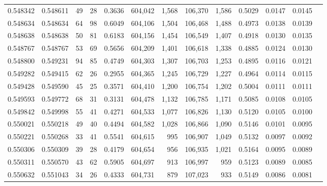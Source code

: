 \begin{tabular}{rrrrrrrrrrrrr}
0.548342 & 0.548611 &    49 &    28 &                                     0.3636 & 604,042 &   1,568 & 106,370 &   1,586 & 0.5029 & 0.0147 & 0.0145 \\
0.548634 & 0.548634 &    64 &    98 &                                     0.6049 & 604,106 &   1,504 & 106,468 &   1,488 & 0.4973 & 0.0138 & 0.0139 \\
0.548638 & 0.548638 &    50 &    81 &                                     0.6183 & 604,156 &   1,454 & 106,549 &   1,407 & 0.4918 & 0.0130 & 0.0135 \\
0.548767 & 0.548767 &    53 &    69 &                                     0.5656 & 604,209 &   1,401 & 106,618 &   1,338 & 0.4885 & 0.0124 & 0.0130 \\
0.548800 & 0.549231 &    94 &    85 &                                     0.4749 & 604,303 &   1,307 & 106,703 &   1,253 & 0.4895 & 0.0116 & 0.0121 \\
0.549282 & 0.549415 &    62 &    26 &                                     0.2955 & 604,365 &   1,245 & 106,729 &   1,227 & 0.4964 & 0.0114 & 0.0115 \\
0.549428 & 0.549590 &    45 &    25 &                                     0.3571 & 604,410 &   1,200 & 106,754 &   1,202 & 0.5004 & 0.0111 & 0.0111 \\
0.549593 & 0.549772 &    68 &    31 &                                     0.3131 & 604,478 &   1,132 & 106,785 &   1,171 & 0.5085 & 0.0108 & 0.0105 \\
0.549842 & 0.549998 &    55 &    41 &                                     0.4271 & 604,533 &   1,077 & 106,826 &   1,130 & 0.5120 & 0.0105 & 0.0100 \\
0.550021 & 0.550218 &    49 &    40 &                                     0.4494 & 604,582 &   1,028 & 106,866 &   1,090 & 0.5146 & 0.0101 & 0.0095 \\
0.550221 & 0.550268 &    33 &    41 &                                     0.5541 & 604,615 &     995 & 106,907 &   1,049 & 0.5132 & 0.0097 & 0.0092 \\
0.550306 & 0.550309 &    39 &    28 &                                     0.4179 & 604,654 &     956 & 106,935 &   1,021 & 0.5164 & 0.0095 & 0.0089 \\
0.550311 & 0.550570 &    43 &    62 &                                     0.5905 & 604,697 &     913 & 106,997 &     959 & 0.5123 & 0.0089 & 0.0085 \\
0.550632 & 0.551043 &    34 &    26 &                                     0.4333 & 604,731 &     879 & 107,023 &     933 & 0.5149 & 0.0086 & 0.0081 \\

\end{tabular}
